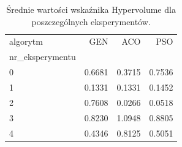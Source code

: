 \begin{table}
\caption{Średnie wartości wskaźnika Hypervolume dla poszczególnych eksperymentów.}
\label{tab:hv_srednie}
\begin{tabular}{lrrr}
\toprule
algorytm & GEN & ACO & PSO \\
nr_eksperymentu &  &  &  \\
\midrule
0 & 0.6681 & 0.3715 & 0.7536 \\
1 & 0.1331 & 0.1331 & 0.1452 \\
2 & 0.7608 & 0.0266 & 0.0518 \\
3 & 0.8230 & 1.0948 & 0.8805 \\
4 & 0.4346 & 0.8125 & 0.5051 \\
\bottomrule
\end{tabular}
\end{table}
